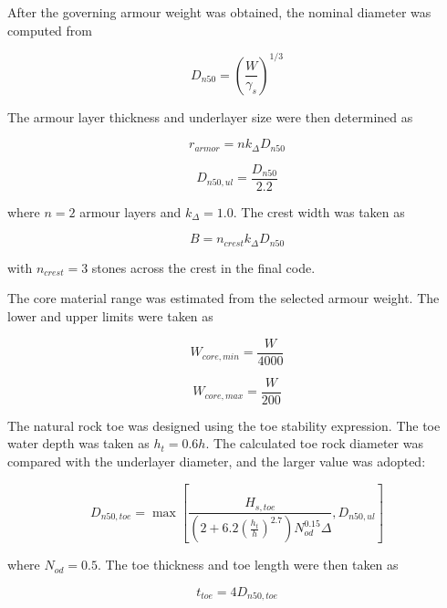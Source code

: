 \documentclass[a4paper, 11pt]{article}
\begin{document}
After the governing armour weight was obtained, the nominal diameter was computed from

\begin{equation}
    D_{n50}=\left(\frac{W}{\gamma_s}\right)^{1/3}
\end{equation}

The armour layer thickness and underlayer size were then determined as

\begin{equation}
    r_{armor}=n k_{\Delta}D_{n50}
\end{equation}

\begin{equation}
    D_{n50,ul}=\frac{D_{n50}}{2.2}
\end{equation}

where \(n=2\) armour layers and \(k_{\Delta}=1.0\). The crest width was taken as

\begin{equation}
    B=n_{crest}k_{\Delta}D_{n50}
\end{equation}

with \(n_{crest}=3\) stones across the crest in the final code.

The core material range was estimated from the selected armour weight. The lower and upper limits were taken as

\begin{equation}
    W_{core,min}=\frac{W}{4000}
\end{equation}

\begin{equation}
    W_{core,max}=\frac{W}{200}
\end{equation}

The natural rock toe was designed using the toe stability expression. The toe water depth was taken as \(h_t=0.6h\). The calculated toe rock diameter was compared with the underlayer diameter, and the larger value was adopted:

\begin{equation}
    D_{n50,toe}=
    \max
    \left[
    \frac{H_{s,toe}}
    {\left(2+6.2\left(\frac{h_t}{h}\right)^{2.7}\right)N_{od}^{0.15}\Delta},
    D_{n50,ul}
    \right]
\end{equation}

where \(N_{od}=0.5\). The toe thickness and toe length were then taken as

\begin{equation}
    t_{toe}=4D_{n50,toe}
\end{equation}
\end{document}
